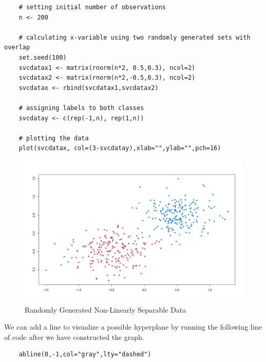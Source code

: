 \documentclass[12pt]{article}
\begin{document}
\begin{verbatim}
    # setting initial number of observations
    n <- 200
    
    # calculating x-variable using two randomly generated sets with overlap
    set.seed(100)
    svcdatax1 <- matrix(rnorm(n*2, 0.5,0.3), ncol=2)
    svcdatax2 <- matrix(rnorm(n*2,-0.5,0.3), ncol=2)
    svcdatax <- rbind(svcdatax1,svcdatax2)
    
    # assigning labels to both classes
    svcdatay <- c(rep(-1,n), rep(1,n))
    
    # plotting the data
    plot(svcdatax, col=(3-svcdatay),xlab="",ylab="",pch=16)
\end{verbatim}

\begin{figure}
    \centering
    \includegraphics[width=5in]{Figures/svc_randomly_generated_points.png}
    \caption{Randomly Generated Non-Linearly Separable Data}
    \label{fig_svc_randomly_generated_points}
\end{figure}

We can add a line to visualize a possible hyperplane by running the following line of code after we have constructed the graph.

\begin{verbatim}
    abline(0,-1,col="gray",lty="dashed")
\end{verbatim}
\end{document}
